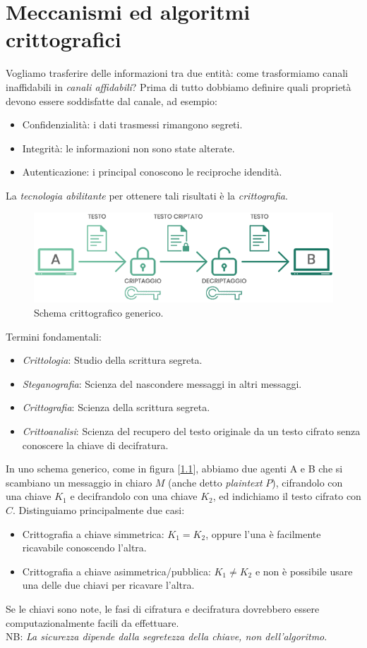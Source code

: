 \documentclass[a4paper, 11pt, notitlepage, fleqn]{report}
\begin{document}
\chapter{Meccanismi ed algoritmi crittografici}
Vogliamo trasferire delle informazioni tra due entità: come trasformiamo canali inaffidabili in \emph{canali affidabili}? Prima di tutto dobbiamo definire quali proprietà devono essere soddisfatte dal canale, ad esempio:
\begin{itemize}
	\item Confidenzialità: i dati trasmessi rimangono segreti.
	\item Integrità: le informazioni non sono state alterate.
	\item Autenticazione: i principal conoscono le reciproche idendità.
\end{itemize}
La \emph{tecnologia abilitante} per ottenere tali risultati è la \emph{crittografia}.
\begin{figure}[htp]
	\centering
	\includegraphics[width=.7\textwidth]{images/Crittografia.png}
	\caption{Schema crittografico generico.}\label{fig:schema-critto}
\end{figure}

\noindent Termini fondamentali:
\begin{itemize}
	\item \emph{Crittologia}: Studio della scrittura segreta.
	\item \emph{Steganografia}: Scienza del nascondere messaggi in altri messaggi.
	\item \emph{Crittografia}: Scienza della scrittura segreta.
	\item \emph{Crittoanalisi}: Scienza del recupero del testo originale da un testo cifrato senza conoscere la chiave di decifratura.
\end{itemize}
In uno schema generico, come in figura [\ref{fig:schema-critto}], abbiamo due agenti A e B che si scambiano un messaggio in chiaro $M$ (anche detto \emph{plaintext} $P$), cifrandolo con una chiave $K_1$ e decifrandolo con una chiave $K_2$, ed indichiamo il testo cifrato con $C$. Distinguiamo principalmente due casi:
\begin{itemize}
	\item Crittografia a chiave simmetrica: $K_1 = K_2$, oppure l'una è facilmente ricavabile conoscendo l'altra.
	\item Crittografia a chiave asimmetrica/pubblica: $K_1 \neq K_2$ e non è possibile usare una delle due chiavi per ricavare l'altra.
\end{itemize}
Se le chiavi sono note, le fasi di cifratura e decifratura dovrebbero essere computazionalmente facili da effettuare.\\
NB: \emph{La sicurezza dipende dalla segretezza della chiave, non dell'algoritmo}.
\end{document}
